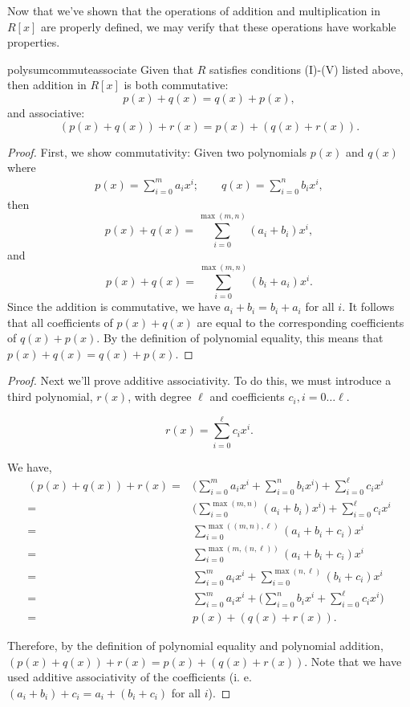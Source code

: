 Now that we've shown that the operations of addition and multiplication in $R[x]$ are properly defined, we may verify that these operations have workable properties.

\begin{prop}{polysumcommuteassociate}  Given that $R$ satisfies conditions (I)-(V) listed above, then addition in $R[x]$ is both commutative: 
	\[p(x)+q(x) = q(x) + p(x), \]	
and associative:	
	\[(p(x) + q(x)) + r(x)  = p(x) + (q(x) + r(x)).\]	
\end {prop}
\begin{proof}{}
First, we show commutativity:	
Given two polynomials $p(x)$ and $q(x)$ where
\begin{align*}
p(x)  = \sum^{m}_{i=0} a_i x^i; \qquad
q(x)  = \sum^{n}_{i=0} b_i x^i,
\end{align*}	
then 
\[
p(x) + q(x) =  \sum_{i=0}^{\max(m,n)} (a_i + b_i) x^i,
\]
and
\[
p(x) + q(x) =  \sum_{i=0}^{\max(m,n)} (b_i + a_i) x^i.
\]
Since the addition is commutative, we have $a_i + b_i = b_i + a_i$ for all $i$. It follows that all coefficients of $p(x) + q(x)$ are equal to the corresponding coefficients of $q(x) + p(x)$. By the definition of polynomial equality, this means that 
$p(x) + q(x) = q(x) + p(x)$.  
\end {proof}

\begin{proof}{}
Next we'll prove additive associativity. To do this, we must introduce a third polynomial, $r(x)$, with degree $\ell$ and coefficients $ c_i, i=0 \ldots \ell$.

\[r(x) = \sum^{\ell}_{i=0} c_ix^i.\]

We have,
\begin{align*}
(p(x)+q(x))+r(x) =& \bigg(\sum^{m}_{i=0} a_i x^i+\sum^{n}_{i=0} b_i x^i \bigg)+  \sum^{\ell}_{i=0} c_ix^i\\
=& \bigg(\sum_{i=0}^{\max(m,n)} (a_i + b_i) x^i\bigg)+  \sum^{\ell}_{i=0} c_ix^i\\
=& \sum_{i=0}^{\max((m,n),\ell)} (a_i + b_i+c_i) x^i\\
=& \sum_{i=0}^{\max(m,(n,\ell))} (a_i + b_i+c_i) x^i\\
=& \sum^{m}_{i=0} a_i x^i+\sum_{i=0}^{\max(n,\ell)} (b_i + c_i) x^i\\
=& \sum^{m}_{i=0} a_i x^i+\bigg(\sum^{n}_{i=0} b_i x^i+\sum^{\ell}_{i=0} c_i x^i \bigg)\\
=& p(x)+(q(x)+r(x)).
\end{align*}

Therefore, by the definition of polynomial equality and polynomial addition, $(p(x)+q(x))+r(x)=p(x)+(q(x)+r(x))$. Note that we have used additive associativity of the coefficients (i. e. $(a_i+b_i)+c_i=a_i+(b_i+c_i)$ for all $i$).  

\end {proof}

